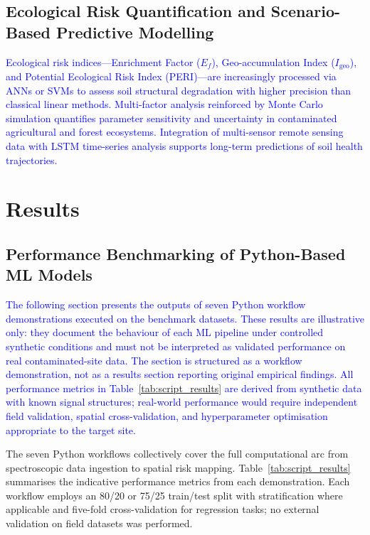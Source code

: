 \documentclass[environments,article,submit,pdftex,moreauthors]{Definitions/mdpi}
\begin{document}
\subsection{Ecological Risk Quantification and Scenario-Based Predictive
    Modelling}\label{sec4.2}

\textcolor{blue}{Ecological risk indices---Enrichment Factor ($E_f$), Geo-accumulation Index ($I_{\text{geo}}$), and Potential Ecological Risk Index (PERI)---are increasingly processed via ANNs or SVMs to assess soil structural degradation with higher precision than classical linear methods. Multi-factor analysis reinforced by Monte Carlo simulation quantifies parameter sensitivity and uncertainty in contaminated agricultural and forest ecosystems. Integration of multi-sensor remote sensing data with LSTM time-series analysis supports long-term predictions of soil health trajectories.}

\section{Results}\label{sec5}

\subsection{Performance Benchmarking of Python-Based ML Models}\label{sec5.1}

\textcolor{blue}{The following section presents the outputs of seven Python workflow demonstrations executed on the benchmark datasets. These results are illustrative only: they document the behaviour of each ML pipeline under controlled synthetic conditions and must not be interpreted as validated performance on real contaminated-site data. The section is structured as a workflow demonstration, not as a results section reporting original empirical findings. All performance metrics in Table~\ref{tab:script_results} are derived from synthetic data with known signal structures; real-world performance would require independent field validation, spatial cross-validation, and hyperparameter optimisation appropriate to the target site.}

The seven Python workflows collectively cover the full computational arc from spectroscopic data ingestion to spatial risk mapping. Table~\ref{tab:script_results} summarises the indicative performance metrics from each  demonstration. Each workflow employs an 80/20 or 75/25 train/test split with stratification where applicable and five-fold cross-validation for regression tasks; no external validation on field datasets was performed.
\end{document}
